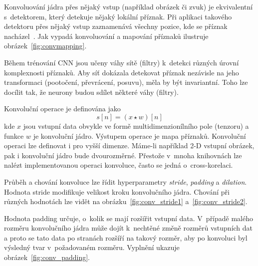 Konvoluování jádra přes nějaký vstup (například obrázek či zvuk) je ekvivalentní s~detektorem, který detekuje nějaký lokální příznak. Při aplikaci takového detektoru přes nějaký vstup zaznamenává všechny pozice, kde se příznak nacházel~\cite{mitdeeplearning_small}. Jak vypadá konvoluování a mapování příznaků ilustruje obrázek~\ref{fig:convmapping}.

Během trénování CNN jsou učeny váhy sítě (filtry) k~detekci různých úrovní komplexnosti příznaků. Aby síť dokázala detekovat příznak nezávisle na jeho transformaci (pootočení, převrácení, posuvu), měla by být invariantní. Toho lze docílit tak, že neurony budou sdílet některé váhy (filtry).


Konvoluční operace je definována jako
\begin{equation}
   s[n] = (x \star w)[n]
\end{equation}
kde $x$ jsou vstupní data obvykle ve formě multidimenzionílního pole (tenzoru) a funkce $w$ je konvoluční jádro. Výstupem operace je mapa příznaků. Konvoluční operaci lze definovat i pro vyšší dimenze. Máme-li například 2-D vstupní obrázek, pak i konvoluční jádro bude dvourozměrné. Přestože v~mnoha knihovnách lze nalézt implementovanou operaci konvoluce, často se jedná o~cross-korelaci.


Průběh a chování konvoluce lze řídit hyperparametry \textit{stride}, \textit{padding} a \textit{dilation}. Hodnota stride modifikuje velikost kroku konvolučního jádra. Chování při různých hodnotách lze vidět na obrázku~\ref{fig:conv_stride1} a~\ref{fig:conv_stride2}. 

Hodnota padding určuje, o~kolik se mají rozšířit vstupní data. V~případě malého rozměru konvolučního jádra může dojít k~nechtěné změně rozměrů vstupních dat a proto se tato data po stranách rozšíří na takový rozměr, aby po konvoluci byl výsledný tvar v~požadovaném rozměru. Vyplnění ukazuje obrázek~\ref{fig:conv_padding}.


